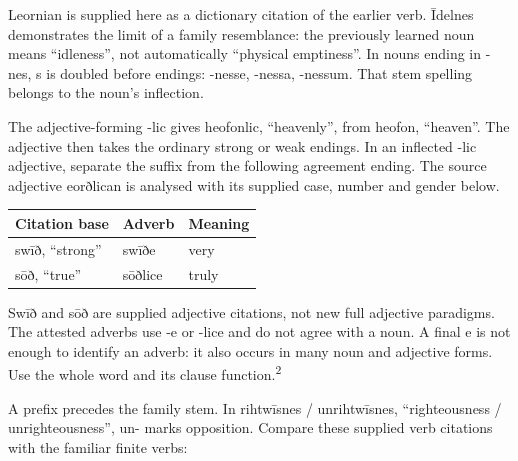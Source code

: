 Leornian is supplied here as a dictionary citation of the earlier verb. Īdelnes demonstrates the limit of a family resemblance: the previously learned noun means “idleness”, not automatically “physical emptiness”. In nouns ending in -nes, s is doubled before endings: -nesse, -nessa, -nessum. That stem spelling belongs to the noun’s inflection.

The adjective-forming -lic gives heofonlic, “heavenly”, from heofon, “heaven”. The adjective then takes the ordinary strong or weak endings. In an inflected -lic adjective, separate the suffix from the following agreement ending. The source adjective eorðlican is analysed with its supplied case, number and gender below.

\par\begingroup
\fontsize{10.5}{13.2}\selectfont
\setlength{\LTleft}{0pt}\setlength{\LTright}{\fill}
\noindent
\begin{tabular}{@{}>{\raggedright\arraybackslash}p{41.26mm}>{\raggedright\arraybackslash}p{38.56mm}>{\raggedright\arraybackslash}p{38.56mm}@{}}
\toprule
\textbf{Citation base} & \textbf{Adverb} & \textbf{Meaning} \\
\midrule
swīð, “strong” & swīðe & very \\
sōð, “true” & sōðlice & truly \\
\bottomrule
\end{tabular}
\par\endgroup

Swīð and sōð are supplied adjective citations, not new full adjective paradigms. The attested adverbs use -e or -lice and do not agree with a noun. A final e is not enough to identify an adverb: it also occurs in many noun and adjective forms. Use the whole word and its clause function.\textsuperscript{2}

A prefix precedes the family stem. In rihtwīsnes /\allowbreak{} unrihtwīsnes, “righteousness /\allowbreak{} unrighteousness”, un- marks opposition. Compare these supplied verb citations with the familiar finite verbs:

